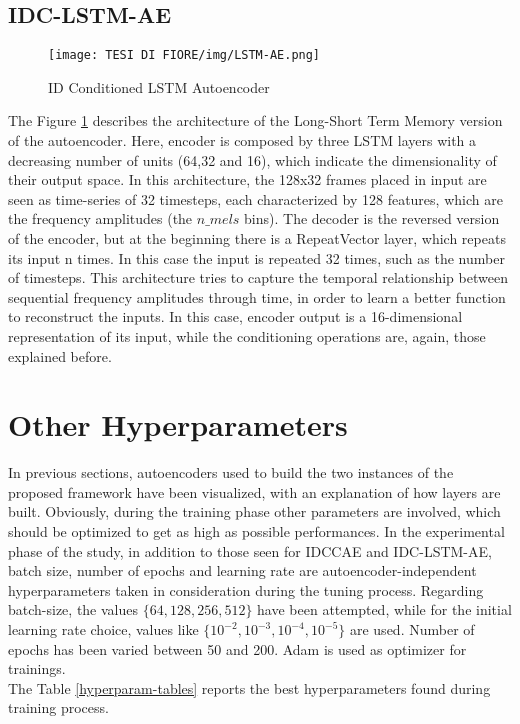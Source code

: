 \subsection{IDC-LSTM-AE}
\begin{figure}[ht]
\texttt{[image: TESI DI FIORE/img/LSTM-AE.png]}
\centering
\caption{ID Conditioned LSTM Autoencoder}
\label{LSTM-AE}
\end{figure}
The Figure \ref{LSTM-AE} describes the architecture of the Long-Short Term Memory version of the autoencoder. Here, encoder is composed by three LSTM layers with a decreasing number of units (64,32 and 16), which indicate the dimensionality of their output space. In this architecture, the 128x32 frames placed in input are seen as time-series of 32 timesteps, each characterized by 128 features, which are the frequency amplitudes (the $n\_mels$ bins). The decoder is the reversed version of the encoder, but at the beginning there is a RepeatVector layer, which repeats its input n times. In this case the input is repeated 32 times, such as the number of timesteps. This architecture tries to capture the temporal relationship between sequential frequency amplitudes through time, in order to learn a better function to reconstruct the inputs. In this case, encoder output is a 16-dimensional representation of its input, while the conditioning operations are, again, those explained before.

\section{Other Hyperparameters}
In previous sections, autoencoders used to build the two instances of the proposed framework have been visualized, with an explanation of how layers are built. Obviously, during the training phase other parameters are involved, which should be optimized to get as high as possible performances. In the experimental phase of the study, in addition to those seen for IDCCAE and IDC-LSTM-AE, batch size, number of epochs and learning rate are autoencoder-independent hyperparameters taken in consideration during the tuning process. Regarding batch-size, the values $\{64,128,256,512\}$ have been attempted, while for the initial learning rate choice, values like $\{10^{-2}, 10^{-3}, 10^{-4}, 10^{-5}\}$ are used. Number of epochs has been varied between 50 and 200. Adam is used as optimizer for trainings.\\
The Table \ref{hyperparam-tables} reports the best hyperparameters found during training process.

